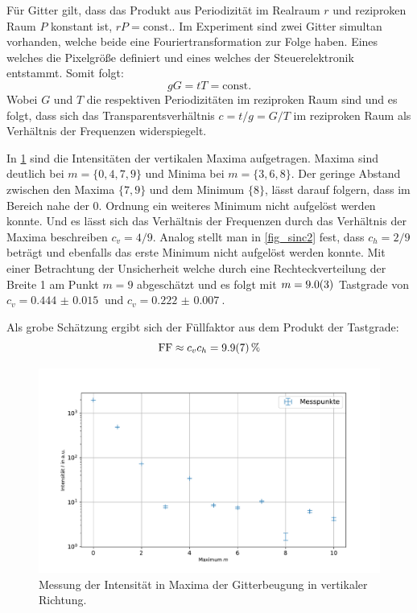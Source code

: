 \documentclass[
	a4paper,
	12pt,
	pagesize,
	ngerman
]{scrartcl}
\begin{document}
		Für Gitter gilt, dass das Produkt aus Periodizität im Realraum $r$ und reziproken Raum $P$ konstant ist, $rP=\text{const.}$.
		Im Experiment sind zwei Gitter simultan vorhanden, welche beide eine Fouriertransformation zur Folge haben.
		Eines welches die Pixelgröße definiert und eines welches der Steuerelektronik entstammt.
		Somit folgt:
		\begin{equation}
			gG =tT = \text{const.}
		\end{equation}
		Wobei $G$ und $T$ die respektiven Periodizitäten im reziproken Raum sind und es folgt, dass sich das Transparentsverhältnis $c=t/g=G/T$ im reziproken Raum als Verhältnis der Frequenzen widerspiegelt.

		In \cref{fig_sinc1} sind die Intensitäten der vertikalen Maxima aufgetragen.
		Maxima sind deutlich bei $m=\{0,4,7,9\}$ und Minima bei $m=\{3,6,8\}$.
		Der geringe Abstand zwischen den Maxima $\{7,9\}$ und dem Minimum $\{8\}$, lässt darauf folgern, dass im Bereich nahe der 0. Ordnung ein weiteres Minimum nicht aufgelöst werden konnte.
		Und es lässt sich das Verhältnis der Frequenzen durch das Verhältnis der Maxima beschreiben $c_v=4/9$.
		Analog stellt man in \cref{fig_sinc2} fest, dass $c_h=2/9$ beträgt und ebenfalls das erste Minimum nicht aufgelöst werden konnte.
		Mit einer Betrachtung der Unsicherheit welche durch eine Rechteckverteilung der Breite 1 am Punkt $m=9$ abgeschätzt und es folgt mit $m=\SI{9+-0.3}{}$ Tastgrade von $c_v=\SI{0.444(15)}{}$ und $c_v=\SI{0.222(7)}{}$.


		Als grobe Schätzung ergibt sich der Füllfaktor aus dem Produkt der Tastgrade:
		\begin{equation}
			\text{FF} \approx c_v c_h =\SI{9.9+-0.7}{\percent}
		\end{equation}


\begin{figure}[H]
			\includegraphics[width=0.8\linewidth]{img/sinc1}
			\caption{
			Messung der Intensität in Maxima der Gitterbeugung in vertikaler Richtung.
			}
			\label{fig_sinc1}
	\end{figure}
\end{document}
